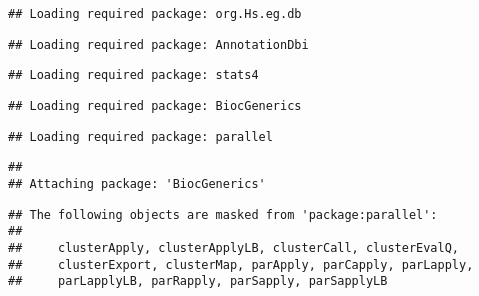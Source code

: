 \documentclass[
]{article}
\newenvironment{Shaded}{\begin{snugshade}}{\end{snugshade}}
\newcommand{\CommentTok}[1]{\textcolor[rgb]{0.56,0.35,0.01}{\textit{#1}}}
\newcommand{\DataTypeTok}[1]{\textcolor[rgb]{0.13,0.29,0.53}{#1}}
\newcommand{\DecValTok}[1]{\textcolor[rgb]{0.00,0.00,0.81}{#1}}
\newcommand{\FloatTok}[1]{\textcolor[rgb]{0.00,0.00,0.81}{#1}}
\newcommand{\KeywordTok}[1]{\textcolor[rgb]{0.13,0.29,0.53}{\textbf{#1}}}
\newcommand{\NormalTok}[1]{#1}
\newcommand{\OperatorTok}[1]{\textcolor[rgb]{0.81,0.36,0.00}{\textbf{#1}}}
\newcommand{\StringTok}[1]{\textcolor[rgb]{0.31,0.60,0.02}{#1}}
\begin{document}
\begin{Shaded}
\end{Shaded}

\begin{verbatim}
## Loading required package: org.Hs.eg.db
\end{verbatim}

\begin{verbatim}
## Loading required package: AnnotationDbi
\end{verbatim}

\begin{verbatim}
## Loading required package: stats4
\end{verbatim}

\begin{verbatim}
## Loading required package: BiocGenerics
\end{verbatim}

\begin{verbatim}
## Loading required package: parallel
\end{verbatim}

\begin{verbatim}
## 
## Attaching package: 'BiocGenerics'
\end{verbatim}

\begin{verbatim}
## The following objects are masked from 'package:parallel':
## 
##     clusterApply, clusterApplyLB, clusterCall, clusterEvalQ,
##     clusterExport, clusterMap, parApply, parCapply, parLapply,
##     parLapplyLB, parRapply, parSapply, parSapplyLB
\end{verbatim}
\end{document}
